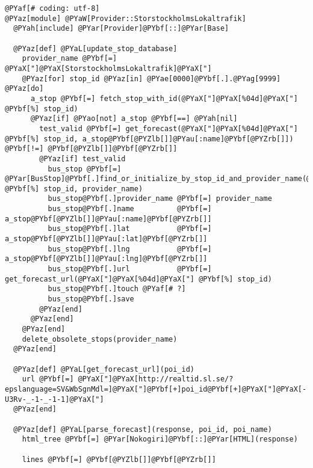 \begin{Verbatim}[commandchars=@\[\]]
@PYaf[# coding: utf-8]
@PYaz[module] @PYaW[Provider::StorstockholmsLokaltrafik]
  @PYah[include] @PYar[Provider]@PYbf[::]@PYar[Base]

  @PYaz[def] @PYaL[update_stop_database]
    provider_name @PYbf[=] @PYaX["]@PYaX[StorstockholmsLokaltrafik]@PYaX["]
    @PYaz[for] stop_id @PYaz[in] @PYae[0000]@PYbf[.].@PYag[9999] @PYaz[do]
      a_stop @PYbf[=] fetch_stop_with_id(@PYaX["]@PYaX[%04d]@PYaX["] @PYbf[%] stop_id)
      @PYaz[if] @PYao[not] a_stop @PYbf[==] @PYah[nil]
        test_valid @PYbf[=] get_forecast(@PYaX["]@PYaX[%04d]@PYaX["] @PYbf[%] stop_id, a_stop@PYbf[@PYZlb[]]@PYau[:name]@PYbf[@PYZrb[]]) @PYbf[!=] @PYbf[@PYZlb[]]@PYbf[@PYZrb[]]
        @PYaz[if] test_valid
          bus_stop @PYbf[=] @PYar[BusStop]@PYbf[.]find_or_initialize_by_stop_id_and_provider_name(@PYaX["]@PYaX[%04d]@PYaX["] @PYbf[%] stop_id, provider_name)
          bus_stop@PYbf[.]provider_name @PYbf[=] provider_name
          bus_stop@PYbf[.]name          @PYbf[=] a_stop@PYbf[@PYZlb[]]@PYau[:name]@PYbf[@PYZrb[]]
          bus_stop@PYbf[.]lat           @PYbf[=] a_stop@PYbf[@PYZlb[]]@PYau[:lat]@PYbf[@PYZrb[]]
          bus_stop@PYbf[.]lng           @PYbf[=] a_stop@PYbf[@PYZlb[]]@PYau[:lng]@PYbf[@PYZrb[]]
          bus_stop@PYbf[.]url           @PYbf[=] get_forecast_url(@PYaX["]@PYaX[%04d]@PYaX["] @PYbf[%] stop_id)
          bus_stop@PYbf[.]touch @PYaf[# ?]
          bus_stop@PYbf[.]save
        @PYaz[end]
      @PYaz[end]
    @PYaz[end]
    delete_obsolete_stops(provider_name)
  @PYaz[end]

  @PYaz[def] @PYaL[get_forecast_url](poi_id)
    url @PYbf[=] @PYaX["]@PYaX[http://realtid.sl.se/?epslanguage=SV&WbSgnMdl=]@PYaX["]@PYbf[+]poi_id@PYbf[+]@PYaX["]@PYaX[-U3Rv-_-1-_-1-1]@PYaX["]
  @PYaz[end]
  
  @PYaz[def] @PYaL[parse_forecast](response, poi_id, poi_name)
    html_tree @PYbf[=] @PYar[Nokogiri]@PYbf[::]@PYar[HTML](response)

    lines @PYbf[=] @PYbf[@PYZlb[]]@PYbf[@PYZrb[]]


\end{Verbatim}

